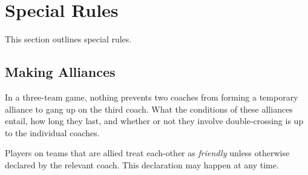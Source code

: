 \section{Special Rules}
This section outlines special rules.
\subsection{Making Alliances}
In a three-team game, nothing prevents two coaches from forming a temporary alliance to gang up on the third coach.
What the conditions of these alliances entail, how long they last, and whether or not they involve double-crossing is up to the individual coaches.

Players on teams that are allied treat each-other as \textit{friendly} unless otherwise declared by the relevant coach.
This declaration may happen at any time.